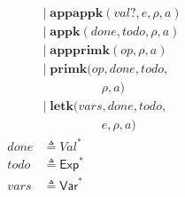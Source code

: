 \documentclass[12pt,draft]{article}
\begin{document}
{\begin{multicols*}{2}
\begin{center}
\begin{align*}
        &|\; \textbf{appappk}(val?, e, \rho, a) \\
        &|\; \textbf{appk}(done, todo, \rho, a) \\
        &|\; \textbf{appprimk}(op, \rho, a) \\
        &|\; \textbf{primk}(op, done, todo, \\
        &\;\;\;\;\;\;\;\;\;\;\;\;\;\;\;\;\;\rho, a) \\
        &|\; \textbf{letk}(vars, done, todo, \\
        &\;\;\;\;\;\;\;\;\;\;\;\;\;\;\;\;\;e, \rho, a) \\
done &\triangleq \textit{Val}^\ast \\
todo &\triangleq \textsf{Exp}^* \\
vars &\triangleq \textsf{Var}^*
\end{align*}
\end{center}
\end{multicols*}
}

\newpage
\end{document}
